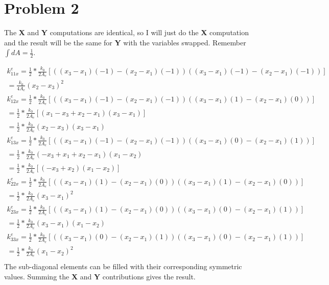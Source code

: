 \documentclass[10pt]{article}
\begin{document}
\section*{Problem 2}
The \textbf{X} and \textbf{Y} computations are identical, so I will just do the \textbf{X} computation and the result will be the same for \textbf{Y} with the variables swapped. Remember $\int dA = \frac12$. 

\begin{gather*}
k_{11x}^e = \frac12*\frac{k_0}{2A_e}\left[((x_3 - x_1)(-1) - (x_2 - x_1)(-1))((x_3 - x_1)(-1) - (x_2 - x_1)(-1))\right]\\
=\frac{k_0}{4A_e}(x_2 - x_3)^2\\
k_{12x}^e =\frac12*\frac{k_0}{2A_e}\left[((x_3 - x_1)(-1) - (x_2 - x_1)(-1))((x_3 - x_1)(1) - (x_2 - x_1)(0))\right]\\
=\frac12*\frac{k_0}{2A_e}\left[(x_1 - x_3 + x_2 - x_1)(x_3 - x_1)\right]\\
=\frac12*\frac{k_0}{2A_e}(x_2-x_3)(x_3-x_1)\\
 k_{13x}^e =\frac12*\frac{k_0}{2A_e}\left[((x_3 - x_1)(-1) - (x_2 - x_1)(-1))((x_3 - x_1)(0) - (x_2 - x_1)(1))\right]\\
=\frac12*\frac{k_0}{2A_e}(-x_3+x_1+x_2-x_1)(x_1-x_2)\\
=\frac12*\frac{k_0}{2A_e}[(-x_3+x_2)(x_1-x_2)]\\
 k_{22x}^e =\frac12*\frac{k_0}{2A_e}\left[((x_3 - x_1)(1) - (x_2 - x_1)(0))((x_3 - x_1)(1) - (x_2 - x_1)(0))\right]\\
=\frac12*\frac{k_0}{2A_e}(x_3-x_1)^2\\
k_{23x}^e =\frac12*\frac{k_0}{2A_e}\left[((x_3 - x_1)(1) - (x_2 - x_1)(0))((x_3 - x_1)(0) - (x_2 - x_1)(1))\right]\\
=\frac12*\frac{k_0}{2A_e}(x_3 - x_1)(x_1-x_2)\\
k_{33x}^e =\frac12*\frac{k_0}{2A_e}\left[((x_3 - x_1)(0) - (x_2 - x_1)(1))((x_3 - x_1)(0) - (x_2 - x_1)(1))\right]\\
=\frac12*\frac{k_0}{2A_e}(x_1-x_2)^2\\
\end{gather*}
The sub-diagonal elements can be filled with their corresponding symmetric values. Summing the \textbf{X} and \textbf{Y} contributions gives the result.
\end{document}
